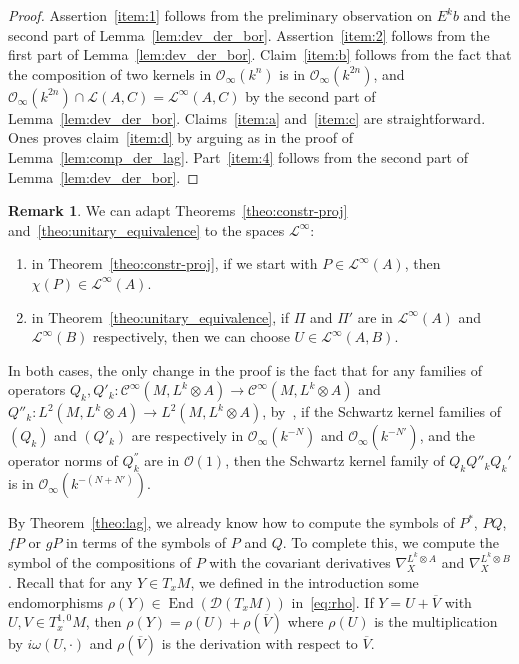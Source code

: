 \documentclass[10pt,a4paper]{article}
\theoremstyle{definition}
\newtheorem{rema}[theo]{Remark}
\numberwithin{equation}{section}
\newcommand{\om}{{\omega}}
\newcommand{\con}{\overline}
\newcommand{\op}{\operatorname}
\newcommand{\Ci}{{\mathcal{C}}^{\infty}}
\newcommand{\bigo}{\mathcal{O}}
\newcommand{\biginf}{\mathcal{O}_{\infty}}
\newcommand{\D}{\mathcal{D}}
\newcommand{\lag}{\mathcal{L}}
\begin{document}
\begin{proof}
Assertion~\ref{item:1} follows from the preliminary
observation on $E^kb$ and the second part of Lemma~\ref{lem:dev_der_bor}. Assertion~\ref{item:2} follows from the first part of Lemma~\ref{lem:dev_der_bor}. Claim~\ref{item:b} follows from the fact that the composition of two kernels in $\biginf (k^{n})$ is in $\biginf (k^{2n})$, and $\biginf (k^{2n}) \cap \lag (A,C) = \lag^{\infty} (A,C)$ by the second part of Lemma~\ref{lem:dev_der_bor}. Claims~\ref{item:a} and~\ref{item:c} are straightforward. Ones proves claim~\ref{item:d} by arguing as in the proof of Lemma~\ref{lem:comp_der_lag}. Part~\ref{item:4} follows from the second part of Lemma~\ref{lem:dev_der_bor}.
\end{proof}

\begin{rema} \label{sec:rem_linfty}
We can adapt Theorems~\ref{theo:constr-proj} and~\ref{theo:unitary_equivalence} to the spaces $\lag^{\infty}$:
\begin{enumerate}
\item in Theorem~\ref{theo:constr-proj}, if we start with $P \in \lag^{\infty} (A)$, then $\chi (P) \in \lag ^{\infty} (A)$.
\item in Theorem~\ref{theo:unitary_equivalence}, if $\Pi$ and $\Pi'$ are in $\lag^{\infty} (A)$ and $\lag^{\infty} (B)$ respectively, then we can choose $U \in \lag^{\infty} (A,B)$.
\end{enumerate}
In both cases, the only change in the proof is the fact that for any families of operators $Q_k, Q'_k : \Ci (M,L^k \otimes A) \rightarrow \Ci (M, L^k\otimes A)$ and $Q''_k : L^2 (M, L^k
\otimes A) \rightarrow L^2 (M, L^k \otimes A)$, by~\cite[Section~4.3]{oim}, if the Schwartz kernel families of $(Q_k)$ and $(Q'_k)$ are respectively in $\biginf (k^{-N})$ and $\biginf (k^{-N'})$, and the operator norms of $Q_k^{''}$ are in $\bigo (1)$, then the Schwartz kernel family of $Q_k Q''_k Q_k'$ is in $\biginf (k^{-(N +N')})$.
\end{rema}

By Theorem~\ref{theo:lag}, we already know how to compute the symbols of $P^*$, $PQ$, $f P$ or $gP$ in terms of the symbols of $P$ and $Q$. To complete this, we compute the symbol of the compositions of $P$ with the covariant derivatives $\nabla_X^{L^k \otimes A}$ and $\nabla_X^{L^k \otimes B}$. Recall that for any $Y \in T_xM$, we defined in the introduction some endomorphisms $\rho (Y) \in \op{End} (\D (T_xM))$ in~\eqref{eq:rho}. If $Y = U + \con V$ with $U, V \in T_x ^{1,0} M$, then $\rho (Y)=
\rho (U) + \rho (\con V)$ where $\rho(U)$ is the multiplication by $i \om (U, \cdot)$ and $\rho (\con{V})$ is the derivation with respect to $\con{V}$.
\end{document}
